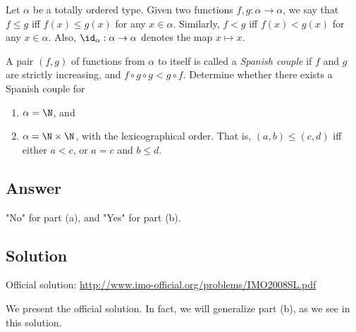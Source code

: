 Let $\alpha$ be a totally ordered type.
Given two functions $f, g : \alpha \to \alpha$, we say that $f \leq g$ iff $f(x) \leq g(x)$ for any $x \in \alpha$.
Similarly, $f < g$ iff $f(x) < g(x)$ for any $x \in \alpha$.
Also, $\id_{\alpha} : \alpha \to \alpha$ denotes the map $x \mapsto x$.

A pair $(f, g)$ of functions from $\alpha$ to itself is called a \emph{Spanish couple} if $f$ and $g$ are strictly increasing, and $f \circ g \circ g < g \circ f$.
Determine whether there exists a Spanish couple for
\begin{enumerate}[label=(\alph*)]
    \item   $\alpha = \N$, and
    \item   $\alpha = \N \times \N$, with the lexicographical order.
            That is, $(a, b) \leq (c, d)$ iff either $a < c$, or $a = c$ and $b \leq d$.
\end{enumerate}



\subsection*{Answer}

"No" for part (a), and "Yes" for part (b).



\subsection*{Solution}

Official solution: \url{http://www.imo-official.org/problems/IMO2008SL.pdf}

We present the official solution.
In fact, we will generalize part (b), as we see in this solution.

